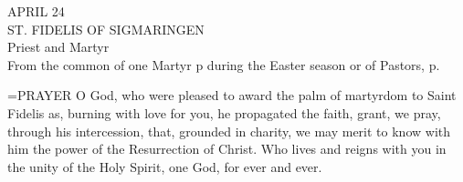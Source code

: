 \begin{center}\normalsize APRIL 24\\
\footnotesize ST. FIDELIS OF SIGMARINGEN\\
\footnotesize Priest and Martyr\\
\footnotesize From the common of one Martyr p     during the Easter season or of Pastors, p. \\
\end{center}

\hangindent=\parindent \small{PRAYER 
O God, who were pleased to award
the palm of martyrdom to Saint Fidelis
as, burning with love for you, he propagated the faith,
grant, we pray, through his intercession,
that, grounded in charity,
we may merit to know with him
the power of the Resurrection of Christ.
Who lives and reigns with you in the unity of the Holy Spirit,
one God, for ever and ever.\\}
 
